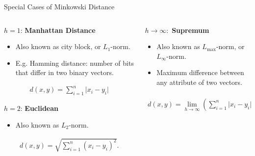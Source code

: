 \begin{frame}{Special Cases of Minkowski Distance}
	\begin{columns}
		\begin{column}{0.5\textwidth}
			$h=1$: \textbf{Manhattan Distance}
			\begin{itemize}
				\item Also known as city block, or $L_1$-norm.
				\item E.g. Hamming distance: number of bits that differ in two binary
				      vectors.
			\end{itemize}
			\vspace*{-1.5em}
			\begin{align*}
				d(x,y) = \sum_{i=1}^{n} \vert x_i - y_i \vert
			\end{align*}

			$h=2$: \textbf{Euclidean}
			\begin{itemize}
				\item Also known as $L_2$-norm.
			\end{itemize}
			\vspace*{-1.5em}
			\begin{align*}
				d(x,y) = \sqrt{\sum_{i=1}^{n} (x_i-y_i)^2}.
			\end{align*}
		\end{column}

		\begin{column}{0.5\textwidth}
			$h \rightarrow \infty:$ \textbf{Supremum}
			\begin{itemize}
				\item Also known as $L_{\text{max}}$-norm, or $L_\infty$-norm.
				\item Maximum difference between any attribute of two vectors.
			\end{itemize}
			\vspace*{-1.5em}
			\begin{align*}
				d(x,y) = \lim_{h \rightarrow \infty} \left( \sum_{i=1}^{n} \vert x_i - y_i \vert^{h} \right)^{\frac{1}{h}} = \max_i \vert x_i-y_i \vert.
			\end{align*}
		\end{column}
	\end{columns}
\end{frame}

